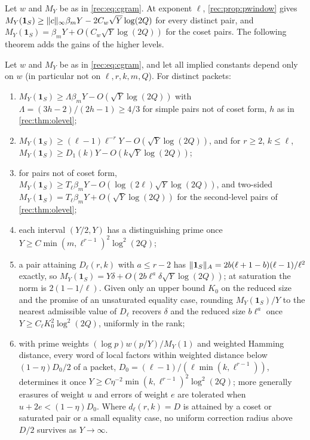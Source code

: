 Let $w$ and $M_Y$ be as in \eqref{rec:eq:cgram}. At exponent $\ell$, \cref{rec:prop:pwindow} gives
$M_Y(\mathbf 1_S)\ge\lVert c\rVert_\infty\beta_mY-2C_w\sqrt Y\log(2Q)$ for every distinct pair, and $M_Y(\mathbf 1_S)=\beta_mY+O(C_w\sqrt Y\log(2Q))$ for the coset
pairs. The following theorem adds the gains of the higher levels.

\begin{theorem}\label{rec:thm:ofinite}
Let $w$ and $M_Y$ be as in \eqref{rec:eq:cgram}, and let all implied constants depend only on $w$ (in particular not
on $\ell,r,k,m,Q$). For distinct packets:
\begin{enumerate}
\item $M_Y(\mathbf 1_S)\ge\Lambda\beta_mY-O(\sqrt Y\log(2Q))$ with $\Lambda=(3h-2)/(2h-1)\ge4/3$ for simple pairs not of coset form, $h$ as in
\cref{rec:thm:olevel};
\item $M_Y(\mathbf 1_S)\ge(\ell-1)\ell^{-r}Y-O(\sqrt Y\log(2Q))$, and for $r\ge2$, $k\le\ell$, $M_Y(\mathbf 1_S)\ge D_1(k)Y-O(k\sqrt Y\log(2Q))$;
\item for pairs not of coset form, $M_Y(\mathbf 1_S)\ge T_\ell\beta_mY-O(\log(2\ell)\sqrt Y\log(2Q))$, and two-sided
$M_Y(\mathbf 1_S)=T_\ell\beta_mY+O(\sqrt Y\log(2Q))$ for the second-level pairs of \cref{rec:thm:olevel};
\item each interval $(Y/2,Y)$ has a distinguishing prime once $Y\ge C\min(m,\ell^{r-1})^2\log^2(2Q)$;
\item a pair attaining $D_\ell(r,k)$ with $a\le r-2$ has $\lVert\mathbf 1_S\rVert_A=2b(\ell+1-b)(\ell-1)/\ell^2$ exactly, so
$M_Y(\mathbf 1_S)=Y\delta+O(2b\ell^a\delta\sqrt Y\log(2Q))$; at saturation the norm is $2(1-1/\ell)$. Given only an upper bound
$K_0$ on the reduced size and the promise of an unsaturated equality case, rounding $M_Y(\mathbf 1_S)/Y$ to the nearest
admissible value of $D_\ell$ recovers $\delta$ and the reduced size $b\ell^a$ once $Y\ge C_\ell K_0^2\log^2(2Q)$, uniformly in the rank;
\item with prime weights $(\log p)w(p/Y)/M_Y(1)$ and weighted Hamming distance, every word of local factors
within weighted distance below $(1-\eta)D_0/2$ of a packet, $D_0=(\ell-1)/(\ell\min(k,\ell^{r-1}))$, determines it once
$Y\ge C\eta^{-2}\min(k,\ell^{r-1})^2\log^2(2Q)$; more generally erasures of weight $u$ and errors of weight $e$ are tolerated when
$u+2e<(1-\eta)D_0$. Where $d_\ell(r,k)=D$ is attained by a coset or saturated pair or a small equality
case, no uniform correction radius above $D/2$ survives as $Y\to\infty$.
\end{enumerate}
\end{theorem}

